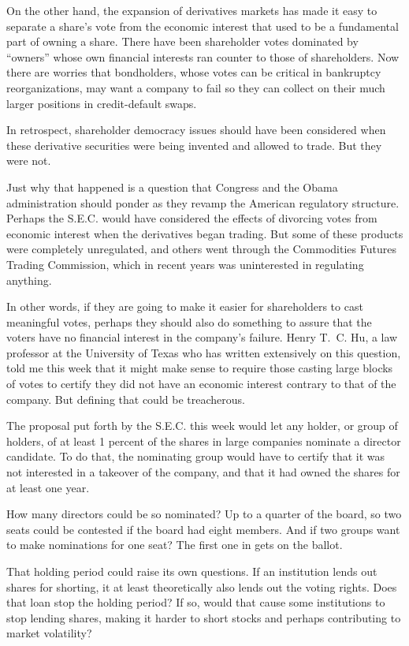 \documentclass[12pt,a4paper,onecolumn]{article}
\begin{document}
On the other hand, the expansion of derivatives markets has made it easy to separate a share's vote
from the economic interest that used to be a fundamental part of owning a share. There have been
shareholder votes dominated by ``owners'' whose own financial interests ran counter to those of
shareholders. Now there are worries that bondholders, whose votes can be critical in bankruptcy
reorganizations, may want a company to fail so they can collect on their much larger positions in
credit-default swaps.

In retrospect, shareholder democracy issues should have been considered when these derivative
securities were being invented and allowed to trade. But they were not.

Just why that happened is a question that Congress and the Obama administration should ponder as
they revamp the American regulatory structure. Perhaps the S.E.C. would have considered the effects
of divorcing votes from economic interest when the derivatives began trading. But some of these
products were completely unregulated, and others went through the Commodities Futures Trading
Commission, which in recent years was uninterested in regulating anything.

In other words, if they are going to make it easier for shareholders to cast meaningful votes,
perhaps they should also do something to assure that the voters have no financial interest in the
company's failure. Henry T.~C. Hu, a law professor at the University of Texas who has written
extensively on this question, told me this week that it might make sense to require those casting
large blocks of votes to certify they did not have an economic interest contrary to that of the
company. But defining that could be treacherous.

The proposal put forth by the S.E.C. this week would let any holder, or group of holders, of at
least 1 percent of the shares in large companies nominate a director candidate. To do that, the
nominating group would have to certify that it was not interested in a takeover of the company, and
that it had owned the shares for at least one year.

How many directors could be so nominated? Up to a quarter of the board, so two seats could be
contested if the board had eight members. And if two groups want to make nominations for one seat?
The first one in gets on the ballot.

That holding period could raise its own questions. If an institution lends out shares for shorting,
it at least theoretically also lends out the voting rights. Does that loan stop the holding period?
If so, would that cause some institutions to stop lending shares, making it harder to short stocks
and perhaps contributing to market volatility?
\end{document}
